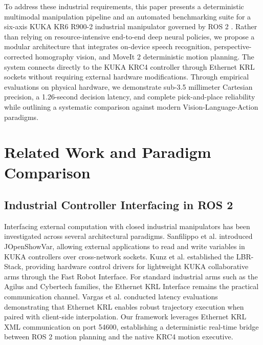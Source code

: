 \documentclass{svproc}
\begin{document}
To address these industrial requirements, this paper presents a deterministic multimodal manipulation pipeline and an automated benchmarking suite for a six-axis KUKA KR6 R900-2 industrial manipulator governed by ROS 2 \cite{ros2_2022}. Rather than relying on resource-intensive end-to-end deep neural policies, we propose a modular architecture that integrates on-device speech recognition, perspective-corrected homography vision, and MoveIt 2 \cite{moveit2014} deterministic motion planning. The system connects directly to the KUKA KRC4 controller through Ethernet KRL sockets without requiring external hardware modifications. Through empirical evaluations on physical hardware, we demonstrate sub-3.5 millimeter Cartesian precision, a 1.26-second decision latency, and complete pick-and-place reliability while outlining a systematic comparison against modern Vision-Language-Action paradigms.

\section{Related Work and Paradigm Comparison}
\label{sec:related_work}

\subsection{Industrial Controller Interfacing in ROS 2}
Interfacing external computation with closed industrial manipulators has been investigated across several architectural paradigms. Sanfilippo et al. \cite{jopenshowvar2015} introduced JOpenShowVar, allowing external applications to read and write variables in KUKA controllers over cross-network sockets. Kunz et al. \cite{lbr_stack2024} established the LBR-Stack, providing hardware control drivers for lightweight KUKA collaborative arms through the Fast Robot Interface. For standard industrial arms such as the Agilus and Cybertech families, the Ethernet KRL Interface remains the practical communication channel. Vargas et al. \cite{kuka_eki_eval2022} conducted latency evaluations demonstrating that Ethernet KRL enables robust trajectory execution when paired with client-side interpolation. Our framework leverages Ethernet KRL XML communication on port 54600, establishing a deterministic real-time bridge between ROS 2 motion planning and the native KRC4 motion executive.
\end{document}
